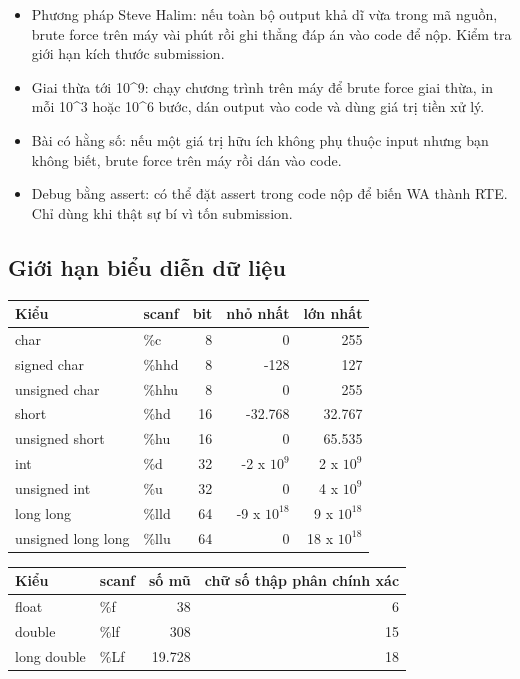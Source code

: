 \documentclass[11pt]{article}
\begin{document}
\begin{itemize}

\item Phương pháp Steve Halim: nếu toàn bộ output khả dĩ vừa trong mã nguồn, brute force trên máy vài phút rồi ghi thẳng đáp án vào code để nộp. Kiểm tra giới hạn kích thước submission.

\item Giai thừa tới 10\textasciicircum{}9: chạy chương trình trên máy để brute force giai thừa, in mỗi 10\textasciicircum{}3 hoặc 10\textasciicircum{}6 bước, dán output vào code và dùng giá trị tiền xử lý.

\item Bài có hằng số: nếu một giá trị hữu ích không phụ thuộc input nhưng bạn không biết, brute force trên máy rồi dán vào code.

\item Debug bằng assert: có thể đặt assert trong code nộp để biến WA thành RTE. Chỉ dùng khi thật sự bí vì tốn submission.

\end{itemize}

\subsection{Giới hạn biểu diễn dữ liệu}

\begin{center}\begin{tabular}{llrrr}\toprule Kiểu & scanf & bit & nhỏ nhất & lớn nhất \\ \midrule
char & \%c & 8 & 0 & 255 \\
signed char & \%hhd & 8 & -128 & 127 \\
unsigned char & \%hhu & 8 & 0 & 255 \\
short & \%hd & 16 & -32.768 & 32.767 \\
unsigned short & \%hu & 16 & 0 & 65.535 \\
int & \%d & 32 & -2 x $10^9$ & 2 x $10^9$ \\
unsigned int & \%u & 32 & 0 & 4 x $10^9$ \\
long long & \%lld & 64 & -9 x $10^{18}$ & 9 x $10^{18}$ \\
unsigned long long & \%llu & 64 & 0 & 18 x $10^{18}$ \\
\bottomrule\end{tabular}\end{center}

\begin{center}\begin{tabular}{llrr}\toprule Kiểu & scanf & số mũ & chữ số thập phân chính xác \\ \midrule
float & \%f & 38 & 6 \\
double & \%lf & 308 & 15 \\
long double & \%Lf & 19.728 & 18 \\
\bottomrule\end{tabular}\end{center}
\end{document}
